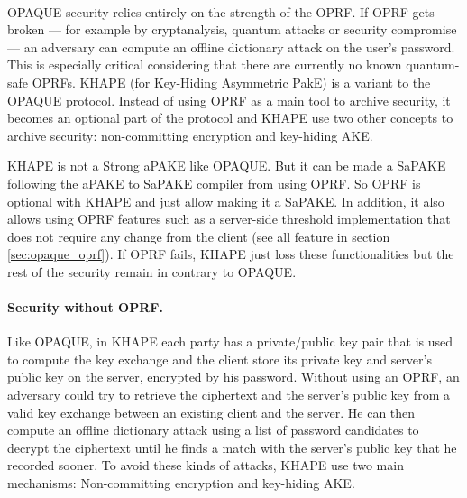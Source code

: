 ﻿\documentclass[../report.tex]{subfiles}
\begin{document}
\paragraph{}
OPAQUE security relies entirely on the strength of the OPRF. If OPRF gets broken --- for example by cryptanalysis, quantum attacks or security compromise --- an adversary can compute an offline dictionary attack on the user's password. This is especially critical considering that there are currently no known quantum-safe OPRFs.
KHAPE (for Key-Hiding Asymmetric PakE) \cite{KHAPE_Paper} is a variant to the OPAQUE protocol. Instead of using OPRF as a main tool to archive security, it becomes an optional part of the protocol and KHAPE use two other concepts to archive security: non-committing encryption and key-hiding AKE.

KHAPE is not a Strong aPAKE like OPAQUE. But it can be made a SaPAKE following the aPAKE to SaPAKE compiler from \cite{OPAQUE_Paper} using OPRF.
So OPRF is optional with KHAPE and just allow making it a SaPAKE. In addition, it also allows using OPRF features such as a server-side threshold implementation that does not require any change from the client (see all feature in section \ref{sec:opaque_oprf}). If OPRF fails, KHAPE just loss these functionalities but the rest of the security remain in contrary to OPAQUE.



\paragraph{Security without OPRF.}
Like OPAQUE, in KHAPE each party has a private/public key pair that is used to compute the key exchange and the client store its private key and server's public key on the server, encrypted by his password.
Without using an OPRF, an adversary could try to retrieve the ciphertext and the server's public key from a valid key exchange between an existing client and the server.
He can then compute an offline dictionary attack using a list of password candidates to decrypt the ciphertext until he finds a match with the server's public key that he recorded sooner.
To avoid these kinds of attacks, KHAPE use two main mechanisms: Non-committing encryption and key-hiding AKE.
\end{document}
